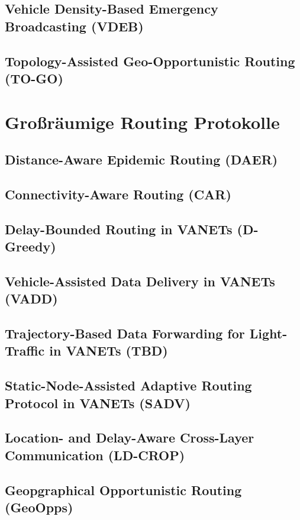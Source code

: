 \documentclass[english,runningheads,a4paper]{llncs}[2018/03/10]
\begin{document}
\subsection{Vehicle Density-Based Emergency Broadcasting (VDEB)}

\subsection{Topology-Assisted Geo-Opportunistic Routing (TO-GO)}

\section{Großräumige Routing Protokolle}
\label{sec:largescaleprotocols}

\subsection{Distance-Aware Epidemic Routing (DAER)}
\subsection{Connectivity-Aware Routing (CAR)}

\subsection{Delay-Bounded Routing in VANETs (D-Greedy)}
\subsection{Vehicle-Assisted Data Delivery in VANETs (VADD)}
\subsection{Trajectory-Based Data Forwarding for Light-Traffic in VANETs (TBD)}
\subsection{Static-Node-Assisted Adaptive Routing Protocol in VANETs (SADV)}
\subsection{Location- and Delay-Aware Cross-Layer Communication (LD-CROP)}
\subsection{Geopgraphical Opportunistic Routing (GeoOpps)}
\end{document}
